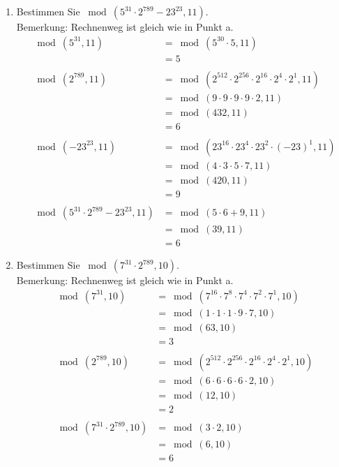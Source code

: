\begin{enumerate}[label=(\alph*)]
		\item  Bestimmen Sie $ \bmod(5^{31} \cdot 2^{789}-23^{23}, 11) $. \\
		Bemerkung: Rechnenweg ist gleich wie in Punkt a.
		\begin{align*}
			\bmod(5^{31},11) &= \bmod(5^{30}\cdot5,11)
			\\&= 5 \\\\
			\bmod(2^{789},11) &= \bmod(2^{512}\cdot2^{256}\cdot2^{16}\cdot2^4\cdot2^1,11)
			\\&= \bmod(9\cdot 9\cdot 9\cdot 9\cdot 2, 11)
			\\&= \bmod(432,11)
			\\&= 6 \\\\
			\bmod(-23^{23},11) &= \bmod(23^{16}\cdot23^{4}\cdot23^{2}\cdot(-23)^1,11)
			\\&= \bmod(4\cdot 3\cdot 5\cdot 7, 11)
			\\&= \bmod(420,11)
			\\&= 9 \\\\ 
			\bmod(5^{31} \cdot 2^{789}-23^{23}, 11) &= \bmod(5 \cdot 6 + 9,11)
			\\&= \bmod(39,11)
			\\&= 6 
		\end{align*}

		\item  Bestimmen Sie $ \bmod(7^{31} \cdot 2^{789}, 10) $. \\
		Bemerkung: Rechnenweg ist gleich wie in Punkt a.
		\begin{align*}
			\bmod(7^{31},10) &= \bmod(7^{16}\cdot7^{8}\cdot7^{4}\cdot7^{2}\cdot7^{1},10)
			\\&= \bmod(1\cdot1\cdot1\cdot9\cdot7,10)
			\\&= \bmod(63,10)
			\\&= 3 \\\\
			\bmod(2^{789},10) &= \bmod(2^{512}\cdot2^{256}\cdot2^{16}\cdot2^4\cdot2^1,10)
			\\&= \bmod(6\cdot 6\cdot 6\cdot 6\cdot 2, 10)
			\\&= \bmod(12,10)
			\\&= 2 \\\\
			\bmod(7^{31} \cdot 2^{789}, 10) &= \bmod(3 \cdot 2,10)
			\\&= \bmod(6,10)
			\\&= 6 
		\end{align*}


\end{enumerate}
